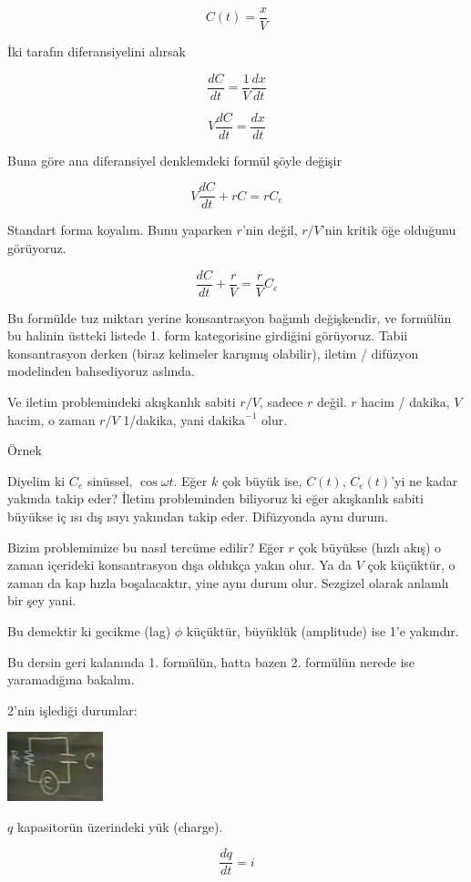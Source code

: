 \documentclass[12pt,fleqn]{article}\usepackage{../../common}
\begin{document}
$$ C(t) = \frac{x}{V} $$

İki tarafın diferansiyelini alırsak

$$ \frac{dC}{dt} = \frac{1}{V}\frac{dx}{dt}$$

$$ V\frac{dC}{dt} = \frac{dx}{dt}$$

Buna göre ana diferansiyel denklemdeki formül şöyle değişir

$$ V \frac{dC}{dt} + rC = rC_e$$

Standart forma koyalım. Bunu yaparken $r$'nin değil, $r/V$'nin kritik öğe
olduğunu görüyoruz.

$$ \frac{dC}{dt} + \frac{r}{V} = \frac{r}{V} C_e $$

Bu formülde tuz miktarı yerine konsantrasyon bağımlı değişkendir, ve
formülün bu halinin üstteki listede 1. form kategorisine girdiğini
görüyoruz. Tabii konsantrasyon derken (biraz kelimeler karışmış olabilir),
iletim / difüzyon modelinden bahsediyoruz aslında. 

Ve iletim problemindeki akışkanlık sabiti $r/V$, sadece $r$ değil. $r$
hacim / dakika, $V$ hacim, o zaman $r/V$ 1/dakika, yani
$\textrm{dakika}^{-1}$ olur.

Örnek

Diyelim ki $C_e$ sinüssel, $\cos \omega t$. Eğer $k$ çok büyük ise, $C(t)$,
$C_e(t)$'yi ne kadar yakında takip eder? İletim probleminden biliyoruz ki
eğer akışkanlık sabiti büyükse iç ısı dış ısıyı yakından takip
eder. Difüzyonda aynı durum.

Bizim problemimize bu nasıl tercüme edilir? Eğer $r$ çok büyükse (hızlı
akış) o zaman içerideki konsantrasyon dışa oldukça yakın olur. Ya da $V$
çok küçüktür, o zaman da kap hızla boşalacaktır, yine aynı durum
olur. Sezgizel olarak anlamlı bir şey yani.

Bu demektir ki gecikme (lag) $\phi$ küçüktür, büyüklük (amplitude) ise 1'e
yakındır. 

Bu dersin geri kalanında 1. formülün, hatta bazen 2. formülün nerede ise
yaramadığına bakalım. 

2'nin işlediği durumlar:

\includegraphics[height=2cm]{8_6.png}

$q$ kapasitorün üzerindeki yük (charge). 

$$ \frac{dq}{dt} = i $$
\end{document}
